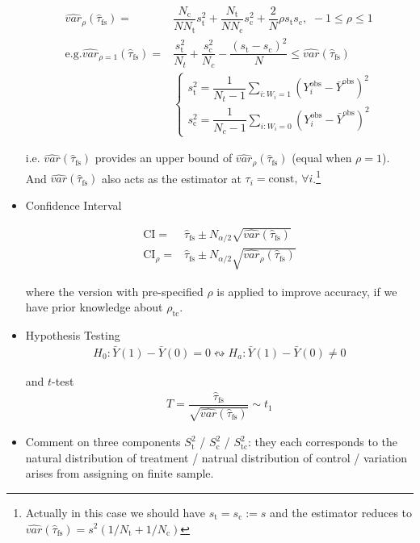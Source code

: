 \begin{itemize}[topsep=2pt,itemsep=0pt]
\begin{align*}
        \hat{var}_\rho (\hat{\tau}_\mathrm{fs} )=&\dfrac{N_\mathrm{c} }{NN_\mathrm{t} }s_\mathrm{t} ^2+\dfrac{N_\mathrm{t} }{NN_\mathrm{c} }s_\mathrm{c}^2+\dfrac{2}{N}\rho s_\mathrm{t}s_\mathrm{c},\,\, -1\leq \rho \leq 1 \\
        \mathrm{e.g.}\hat{var}_{\rho =1}(\hat{\tau}_\mathrm{fs} )=& \dfrac{s^2_\mathrm{t} }{N_t}+\dfrac{s^2_\mathrm{c} }{N_c}-\dfrac{(s_\mathrm{t}-s_\mathrm{c}  )^2}{N}\leq \hat{var}(\hat{\tau}_\mathrm{fs} )\\ 
        &\begin{cases}
            s^2_\mathrm{t}=\dfrac{1}{N_t-1}\sum_{i:W_i=1}\left(Y_i^\mathrm{obs} -\bar{Y}^\mathrm{obs} \right)^2 \\
            s^2_\mathrm{c}=\dfrac{1}{N_c-1}\sum_{i:W_i=0}\left(Y_i^\mathrm{obs} -\bar{Y}^\mathrm{obs} \right)^2
        \end{cases}
    \end{align*}

    i.e. $ \hat{var}(\hat{\tau}_\mathrm{fs} ) $ provides an upper bound of $ \hat{var}_\rho (\hat{\tau}_\mathrm{fs} ) $ (equal when $ \rho =1 $). And $  \hat{var}(\hat{\tau}_\mathrm{fs} )  $ also acts as the estimator at $ \tau_i=\mathrm{const},\,\forall i $.\footnote{Actually in this case we should have $ s_\mathrm{t}=s_\mathrm{c}:=s    $ and the estimator reduces to $ \hat{var}(\hat{\tau}_\mathrm{fs} )=s^2(1/N_\mathrm{t}+1/N_\mathrm{c}  ) $}

    
    
    \item Confidence Interval
    
    \begin{align*}
        \mathrm{CI}=&  \hat{\tau}_\mathrm{fs}\pm N_{\alpha /2}\sqrt{\hat{var}(\hat{\tau}_\mathrm{fs} )}  \\
        \mathrm{CI}_\rho =&  \hat{\tau}_\mathrm{fs}\pm N_{\alpha /2}\sqrt{\hat{var}_\rho (\hat{\tau}_\mathrm{fs} )}  
    \end{align*}
    
    where the version with pre-specified $ \rho  $ is applied to improve accuracy, if we have prior knowledge about $ \rho_\mathrm{tc}   $. 
    
    \item Hypothesis Testing
    \begin{align*}
        H_0:\bar{Y}(1)-\bar{Y}(0)=0\leftrightsquigarrow H_a: \bar{Y}(1)-\bar{Y}(0)\neq 0
    \end{align*}

    and $ t $-test
    \begin{align*}
        T=\dfrac{\hat{\tau}_\mathrm{fs}    }{\sqrt{\hat{var}(\hat{\tau}_\mathrm{fs} )}} \sim t_1
    \end{align*}
    \item Comment on three components $ S^2_\mathrm{t}$ / $S^2_{\mathrm{c} }$ / $S^2_{\mathrm{tc} }  $: they each corresponds to the natural distribution of treatment / natrual distribution of control / variation arises from assigning on finite sample.
    

\end{itemize}
